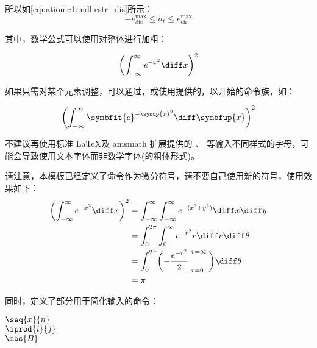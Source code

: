 所以如\cref{equation:c1:mdl:cstr_dis}所示：
\begin{equation}\label{equation:c1:exp}
    -e^{\max}_\text{dis} \leq a_t \leq e^{\max}_\text{ch}
\end{equation}

其中，数学公式可以使用对整体进行加粗：

\begin{texcode}[]{}
\boldmath
\begin{equation}
  \biggl(\int_{-\infty}^\infty e^{-x^2}\diff x\biggr)^2 
\end{equation}
\unboldmath
\end{texcode}

如果只需对某个元素调整，可以通过\clist{\boldsymbol}，或使用提供的，以\clist{\sym}开始的命令族，如\clist{\symup, \symbfup, \symit, \symbfit}：
\begin{texcode}[]{}
  \begin{equation}
    \biggl(\int_{-\infty}^\infty \symbfit{e}^{-\symup{x}^2}\diff \symbfup{x}\biggr)^2 
  \end{equation}
\end{texcode}
不建议再使用标准 \LaTeX 及 amsmath 扩展提供的 \clist{\mathbf}、\clist{\mathcal} 等输入不同样式的字母，可能会导致使用文本字体而非数学字体(的粗体形式)。

请注意，本模板已经定义了\clist{\diff}命令作为微分符号，请不要自己使用新的符号，使用效果如下：
\begin{align}\label{equation:c1:diff}
  \biggl(\int_{-\infty}^\infty e^{-x^2}\diff x\biggr)^2 
    &= \int_{-\infty}^\infty\int_{-\infty}^\infty e^{-(x^2+y^2)}\diff x\diff y \\
    &= \int_0^{2\pi}\int_0^\infty e^{-r^2}r\diff r\diff\theta \\
    &= \int_0^{2\pi}\biggl(-{e^{-r^2}\over2}\bigg\vert_{r=0}^{r=\infty}\,\biggr)\diff\theta \\
    &= \pi
\end{align}


同时，定义了部分用于简化输入的命令：

\begin{texcode}[sidebyside]{}
  $\seq{x}{n}$ \\ %
  $\iprod{i}{j}$ \\ %
  $\mbs{B}$  %
\end{texcode}

\label{section:Environments for math}

